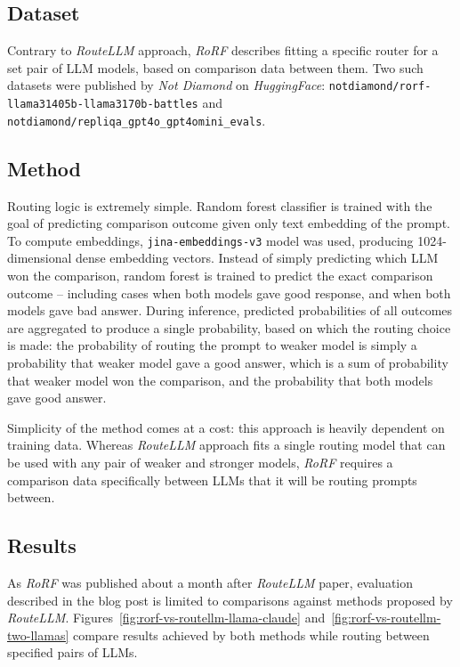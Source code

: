 \documentclass[a4paper,11pt,twoside]{report}
\theoremstyle{definition}
\begin{document}
\subsection{Dataset}

Contrary to \textit{RouteLLM} approach, \textit{RoRF} describes fitting a specific router for a set pair of LLM models, based on comparison data between them. Two such datasets were published by \textit{Not Diamond} on \textit{HuggingFace}: \texttt{notdiamond/rorf-llama31405b-llama3170b-battles} and \texttt{notdiamond/repliqa\_gpt4o\_gpt4omini\_evals}.

\subsection{Method}

Routing logic is extremely simple. Random forest classifier is trained with the goal of predicting comparison outcome given only text embedding of the prompt. To compute embeddings, \texttt{jina-embeddings-v3} model was used, producing 1024-dimensional dense embedding vectors. Instead of simply predicting which LLM won the comparison, random forest is trained to predict the exact comparison outcome -- including cases when both models gave good response, and when both models gave bad answer. During inference, predicted probabilities of all outcomes are aggregated to produce a single probability, based on which the routing choice is made: the probability of routing the prompt to weaker model is simply a probability that weaker model gave a good answer, which is a sum of probability that weaker model won the comparison, and the probability that both models gave good answer. 

Simplicity of the method comes at a cost: this approach is heavily dependent on training data. Whereas \textit{RouteLLM} approach fits a single routing model that can be used with any pair of weaker and stronger models, \textit{RoRF} requires a comparison data specifically between LLMs that it will be routing prompts between.

\subsection{Results}

As \textit{RoRF} was published about a month after \textit{RouteLLM} paper, evaluation described in the blog post is limited to comparisons against methods proposed by \textit{RouteLLM}. Figures~\ref{fig:rorf-vs-routellm-llama-claude} and~\ref{fig:rorf-vs-routellm-two-llamas} compare results achieved by both methods while routing between specified pairs of LLMs.
\end{document}
